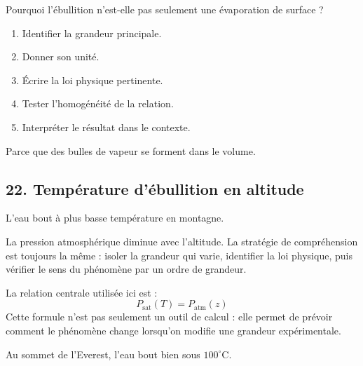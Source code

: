 \documentclass[11pt,a4paper]{article}
\begin{document}
\begin{exercicebox}
Pourquoi l'ébullition n'est-elle pas seulement une évaporation de surface ?
\begin{enumerate}
  \item Identifier la grandeur principale.
  \item Donner son unité.
  \item Écrire la loi physique pertinente.
  \item Tester l'homogénéité de la relation.
  \item Interpréter le résultat dans le contexte.
\end{enumerate}
\end{exercicebox}

\begin{corrigebox}[Indication]
Parce que des bulles de vapeur se forment dans le volume.
\end{corrigebox}


\subsection{22. Température d'ébullition en altitude}

\begin{exemplebox}
L'eau bout à plus basse température en montagne.
\end{exemplebox}

\begin{methodebox}
La pression atmosphérique diminue avec l'altitude.
La stratégie de compréhension est toujours la même : isoler la grandeur qui varie, identifier la loi physique, puis vérifier le sens du phénomène par un ordre de grandeur.
\end{methodebox}

\begin{theorembox}
La relation centrale utilisée ici est :
\[
P_{\mathrm{sat}}(T)=P_{\mathrm{atm}}(z)
\]
Cette formule n'est pas seulement un outil de calcul : elle permet de prévoir comment le phénomène change lorsqu'on modifie une grandeur expérimentale.
\end{theorembox}

\begin{odgbox}
Au sommet de l'Everest, l'eau bout bien sous $100^\circ$C.
\end{odgbox}
\end{document}
